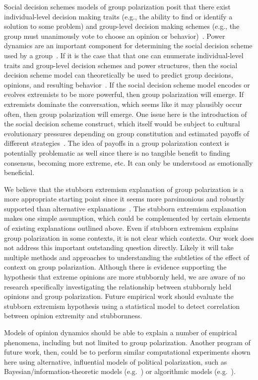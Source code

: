 Social decision schemes models of group polarization posit that there exist
individual-level decision making traits (e.g., the ability to find or identify
a solution to some problem) and group-level decision making schemes (e.g.,
the group must unanimously vote to choose an opinion or behavior)~\cite{Brown2000}. 
Power dynamics are an important component for determining the 
social decision scheme used by a group~\cite{Friedkin1999a}.
If it is the case that that one can enumerate individual-level traits and group-level
decision schemes and power structures, then the social decision scheme model 
can theoretically be used to predict group decisions, opinions, and 
resulting behavior~\cite{Zuber1992,Friedkin1999a}. If the social decision
scheme model encodes or evolves extremists to be more powerful, then group
polarization will emerge. If extremists dominate the conversation, which seems
like it may plausibly occur often, then group polarization will emerge.
One issue here is the introduction of the social decision scheme construct, 
which itself would be subject to cultural evolutionary pressures depending
on group constitution and estimated payoffs of different strategies~\cite{King-Casas2005}. 
The idea of payoffs in a group polarization context is potentially problematic
as well since there is no tangible benefit to finding consensus, becoming
more extreme, etc. It can only be understood as emotionally beneficial.

We believe that the stubborn extremism explanation of group polarization is
a more appropriate starting point since it seems more parsimonious and
robustly supported than alternative explanations~\cite{Kinder2017,Reiss2019,Zmigrod2019}.
The stubborn extremism explanation makes one simple assumption, which could be
complemented by certain elements of existing explanations outlined above.
Even if stubborn extremism explains group polarization in some contexts, 
it is not clear which contexts. Our work does not address this 
important outstanding question directly. Likely it will take multiple methods
and approaches to understanding the subtleties of the effect of context
on group polarization. Although there is evidence supporting the hypothesis that extreme opinions are more stubbornly held, 
we are aware of no research specifically investigating the relationship between stubbornly held opinions and group polarization.
Future empirical work should evaluate the stubborn extremism 
hypothesis using a statistical model to detect correlation between 
opinion extremity and stubbornness. 

Models of opinion dynamics should be able 
to explain a number of empirical phenomena, including but not limited to group polarization. 
Another program of future work, then, could be to perform similar
computational experiments shown here using alternative, 
influential models of political polarization,
such as Bayesian/information-theoretic models (e.g.~) or 
algorithmic models (e.g.~).
    


